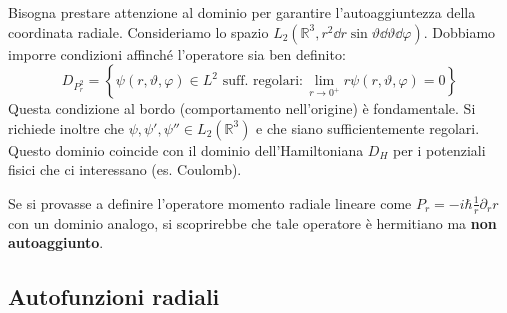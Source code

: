 Bisogna prestare attenzione al dominio per garantire l'autoaggiuntezza della coordinata radiale.
Consideriamo lo spazio \( L_2(\mathbb{R}^3, r^2 \dd{r} \sin\vartheta \dd{\vartheta} \dd{\varphi}) \). Dobbiamo imporre condizioni affinché l'operatore sia ben definito:
\begin{equation}
    D_{P_r^2} = \left\{ \psi(r, \vartheta, \varphi) \in L^2 \text{ suff. regolari} : \lim_{r \to 0^+} r\psi(r, \vartheta, \varphi) = 0 \right\}
\end{equation}
Questa condizione al bordo (comportamento nell'origine) è fondamentale.
Si richiede inoltre che \( \psi, \psi', \psi'' \in L_2(\mathbb{R}^3) \) e che siano sufficientemente regolari.
Questo dominio coincide con il dominio dell'Hamiltoniana \( D_H \) per i potenziali fisici che ci interessano (es. Coulomb).

\begin{remark}
    Se si provasse a definire l'operatore momento radiale lineare come \( P_r = -i\hbar \frac{1}{r} \partial_r r \) con un dominio analogo, si scoprirebbe che tale operatore è hermitiano ma \textbf{non autoaggiunto}.
\end{remark}


\subsection{Autofunzioni radiali}

